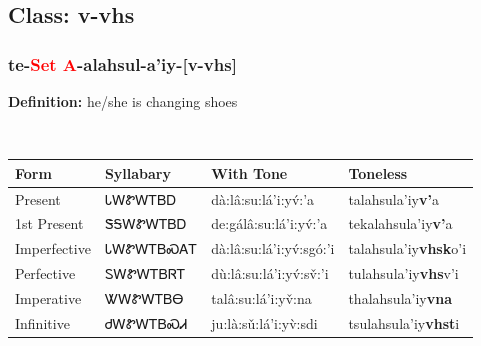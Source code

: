 \subsection*{Class: v-vhs}
\nopagebreak
\needspace{2in}
\subsubsection*{te{-}\textcolor{Red}{Set A}{-}\textbf{alahsul}{-}a'iy{-}[v-vhs]}
\nopagebreak
\textbf{Definition: } he/she is changing shoes
\\[0.5em]
\begin{tabularx}{\textwidth}{l X X X}%
\toprule%
\textbf{Form}&\textbf{Syllabary}&\textbf{With Tone}&\textbf{Toneless}\\%
\midrule%
Present&ᏓᎳᏑᎳᎢᏴᎠ&dà:lâ:su:lá’i:yv́:’a&talahsula'iy\textbf{v'}a\\%
1st Present&ᏕᎦᎳᏑᎳᎢᏴᎠ&de:gálâ:su:lá’i:yv́:’a&tekalahsula'iy\textbf{v'}a\\%
Imperfective&ᏓᎳᏑᎳᎢᏴᏍᎪᎢ&dà:lâ:su:lá’i:yv́:sgó:’i&talahsula'iy\textbf{vhsk}o'i\\%
Perfective&ᏚᎳᏑᎳᎢᏴᏒᎢ&dù:lâ:su:lá’i:yv́:sv̌:’i&tulahsula'iy\textbf{vhs}v'i\\%
Imperative&ᏔᎳᏑᎳᎢᏴᎾ&talâ:su:lá’i:yv̌:na&thalahsula'iy\textbf{vna}\\%
Infinitive&ᏧᎳᏑᎳᎢᏴᏍᏗ&ju:là:sǔ:lá’i:yv̀:sdi&tsulahsula'iy\textbf{vhst}i\\%
\bottomrule%
\end{tabularx}
\\[1em]